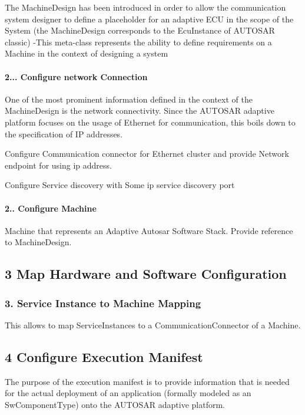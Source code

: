 The Machine\+Design has been introduced in order to allow the communication system designer to define a placeholder for an adaptive E\+CU in the scope of the System (the Machine\+Design corresponds to the Ecu\+Instance of A\+U\+T\+O\+S\+AR classic) -\/\+This meta-\/class represents the ability to define requirements on a Machine in the context of designing a system \paragraph*{2... Configure network Connection}

One of the most prominent information defined in the context of the Machine\+Design is the network connectivity. Since the A\+U\+T\+O\+S\+AR adaptive platform focuses on the usage of Ethernet for communication, this boils down to the specification of IP addresses.
\begin{DoxyItemize}
\item Configure Communication connector for Ethernet cluster and provide Network endpoint for using ip address.
\item Configure Service discovery with Some ip service discovery port
\end{DoxyItemize}

\paragraph*{2.. Configure Machine}

Machine that represents an Adaptive Autosar Software Stack. Provide reference to Machine\+Design.

 \subsection*{3 Map Hardware and Software Configuration}

\subsubsection*{3. Service Instance to Machine Mapping}

This allows to map Service\+Instances to a Communication\+Connector of a Machine.

 \subsection*{4 Configure Execution Manifest}

The purpose of the execution manifest is to provide information that is needed for the actual deployment of an application (formally modeled as an Sw\+Component\+Type) onto the A\+U\+T\+O\+S\+AR adaptive platform. 

